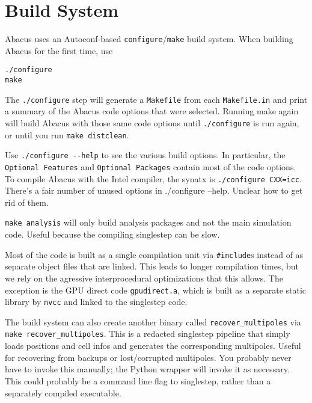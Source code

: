 \documentclass[11pt,preprint]{aastex}
\newcommand{\todo}{}
\newenvironment{private}{\comment}{\endcomment}
\newcommand{\todo}[1]{{\bf TODO: #1}}
\newenvironment{private}
    {\textbf{Not public:}\\
    \begin{tabular}{|p{0.9\textwidth}|}
    \hline\\
    }
    {
    \\\\\hline
    \end{tabular}
    }
\begin{document}
\begin{private}
\section{Build System}
Abacus uses an Autoconf-based \texttt{configure}/\texttt{make} build system.
When building Abacus for the first time, use
\begin{verbatim}
./configure
make
\end{verbatim}
The \verb|./configure| step will generate a \verb|Makefile| from each \verb|Makefile.in|
and print a summary of the Abacus code options
that were selected.  Running make again will build Abacus with those same code
options until \verb|./configure| is run again, or until you run \verb|make distclean|.

Use \verb|./configure --help| to see the various build options.  In particular,
the \verb|Optional Features| and \verb|Optional Packages| contain most of the code
options.  To compile Abacus with the Intel compiler, the synatx is \verb|./configure CXX=icc|.
\todo{There's a fair number of unused options in ./configure --help.  Unclear
how to get rid of them.}

\verb|make analysis| will only build analysis packages and not the main simulation
code.  Useful because the compiling singlestep can be slow.

Most of the code is built as a single compilation unit via \verb|#include|s instead
of as separate object files that are linked.  This leads to longer compilation times,
but we rely on the agressive interprocedural optimizations that this allows.
The exception is the GPU direct code \verb|gpudirect.a|, which is built as a separate
static library by \verb|nvcc| and linked to the singlestep code.

The build system can also create another binary called \verb|recover_multipoles| via
\verb|make recover_multipoles|.  This is a redacted singlestep pipeline that simply loads positions
and cell infos and generates the corresponding multipoles.  Useful for recovering from
backups or lost/corrupted multipoles.  You probably never have to invoke this manually;
the Python wrapper will invoke it as necessary.
\todo{This could probably be a command line flag to singlestep, rather than a
separately compiled executable.}

\end{private}
\end{document}
